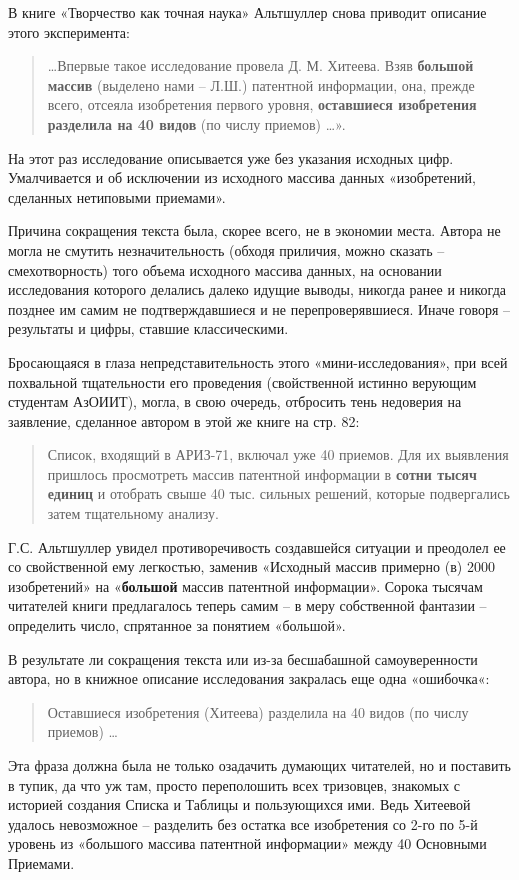 \documentclass[11pt,a4paper]{article}
\begin{document}
В книге «Творчество как точная наука» \cite[стр. 98]{Altshuller1979}
Альтшуллер снова приводит описание этого эксперимента:
\begin{quote}
  …Впервые такое исследование провела Д. М. Хитеева. Взяв \textbf{большой
    массив} (выделено нами -- Л.Ш.) патентной информации, она, прежде всего,
  отсеяла изобретения первого уровня, \textbf{оставшиеся изобретения разделила
    на 40 видов} (по числу приемов) …».
\end{quote}
На этот раз исследование описывается уже без указания исходных цифр.
Умалчивается и об исключении из исходного массива данных «изобретений,
сделанных нетиповыми приемами».

Причина сокращения текста была, скорее всего, не в экономии места. Автора не
могла не смутить незначительность (обходя приличия, можно сказать --
смехотворность) того объема исходного массива данных, на основании
исследования которого делались далеко идущие выводы, никогда ранее и никогда
позднее им самим не подтверждавшиеся и не перепроверявшиеся. Иначе говоря --
результаты и цифры, ставшие классическими.

Бросающаяся в глаза непредставительность этого «мини-исследования», при всей
похвальной тщательности его проведения (свойственной истинно верующим
студентам АзОИИТ), могла, в свою очередь, отбросить тень недоверия на
заявление, сделанное автором в этой же книге на стр. 82:
\begin{quote}
  Список, входящий в АРИЗ-71, включал уже 40 приемов. Для их выявления
  пришлось просмотреть массив патентной информации в \textbf{сотни тысяч
    единиц} и отобрать свыше 40 тыс. сильных решений, которые подвергались
  затем тщательному анализу.
\end{quote}
Г.С. Альтшуллер увидел противоречивость создавшейся ситуации и преодолел ее со
свойственной ему легкостью, заменив «Исходный массив примерно (в) 2000
изобретений» на «\textbf{большой} массив патентной информации». Сорока тысячам
читателей книги предлагалось теперь самим -- в меру собственной фантазии --
определить число, спрятанное за понятием «большой».

В результате ли сокращения текста или из-за бесшабашной самоуверенности
автора, но в книжное описание исследования закралась еще одна «ошибочка«:
\begin{quote}
  Оставшиеся изобретения (Хитеева) разделила на 40 видов (по числу приемов) …
\end{quote}

Эта фраза должна была не только озадачить думающих читателей, но и поставить в
тупик, да что уж там, просто переполошить всех тризовцев, знакомых с историей
создания Списка и Таблицы и пользующихся ими. Ведь Хитеевой удалось
невозможное -- разделить без остатка все изобретения со 2-го по 5-й уровень из
«большого массива патентной информации» между 40 Основными Приемами.
\end{document}

